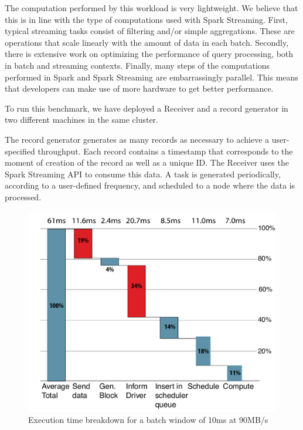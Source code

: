 The computation performed by this workload is very lightweight.
We believe that this is in line with the type of computations used with Spark Streaming.
First, typical streaming tasks consist of filtering and/or simple aggregations.
These are operations that scale linearly with the amount of data in each batch.
Secondly, there is extensive work on optimizing the performance of query processing, both in batch and streaming contexts.
Finally, many steps of the computations performed in Spark and Spark Streaming are embarrassingly parallel. 
This means that developers can make use of more hardware to get better performance. 


To run this benchmark, we have deployed a Receiver and a record generator in two different machines in the same cluster.

The record generator generates as many records as necessary to achieve a user-specified throughput.
Each record contains a timestamp that corresponds to the moment of creation of the record as well as a unique ID.
The Receiver uses the Spark Streaming API to consume this data. 
A task is generated periodically, according to a user-defined frequency, and scheduled to a node where the data is processed.

\begin{figure}[t!]
  \begin{center}
    \includegraphics[scale=0.40]{images_graphs/waterfall/Rplots_illustrator.pdf}
  \end{center}
  \caption{Execution time breakdown for a batch window of 10ms at 90MB/s}
  \label{fig:SparkStreaming_time_breakdown}
\end{figure}

